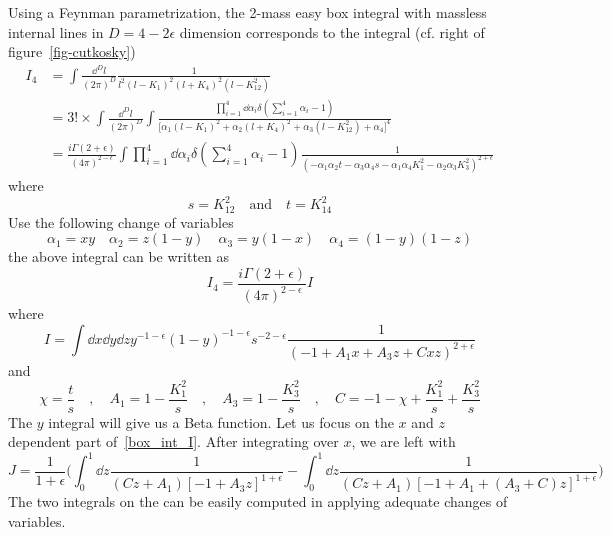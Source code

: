 Using a Feynman parametrization, the 2-mass easy box integral with massless internal lines in $D=4-2\epsilon$ dimension corresponds to the integral (cf. right of figure~\ref{fig-cutkosky})
\begin{equation}
\begin{split}
I_4 & = \int\frac{\dd^D l }{(2\pi)^D}\frac{1}{ l^2(l-K_1)^2(l+K_4)^2 (l-K_{12}^2)}
\\
&=
3!\times\int\frac{\dd^D l }{(2\pi)^D}
\int
\frac{\prod_{i=1}^4\dd\alpha_i \delta(\sum_{i=1}^4\alpha_i -1)}{\big[\alpha_1(l-K_1)^2 + \alpha_2(l+K_4)^2 + \alpha_3 (l-K_{12}^2) + \alpha_4\big]^4}
\\
&= \frac{i\Gamma(2+\epsilon)}{(4\pi)^{2-\epsilon}}\int\prod_{i=1}^4\dd\alpha_i \delta(\sum_{i=1}^4\alpha_i -1)\frac{1}{(-\alpha_1\alpha_2 t - \alpha_3\alpha_4 s 
-\alpha_1\alpha_4 K_1^2 - \alpha_2\alpha_3 K_{3}^2)^{2+\epsilon}}
\end{split}
\end{equation}
where
\begin{equation}
s=K_{12}^2 \quad\mathrm{and}\quad t=K_{14}^2
\end{equation}
Use the following change of variables
\begin{equation}
\alpha_1 = xy \quad
\alpha_2 = z(1-y)\quad
\alpha_3 = y(1-x)\quad
\alpha_4 = (1-y)(1-z)
\end{equation}
the above integral can be written as
\begin{equation}
I_4 = \frac{i\Gamma(2+\epsilon)}{(4\pi)^{2-\epsilon}} I
\end{equation}
where
\begin{equation}\label{box_int_I}
I = \int\dd x\dd y \dd z y^{-1-\epsilon}(1-y)^{-1-\epsilon}s^{-2-\epsilon}
\frac{1}{(-1 + A_1 x + A_3 z + C xz)^{2+\epsilon}}
\end{equation}
and
\begin{equation}
\chi = \frac{t}{s}\quad, \quad
A_1 = 1 - \frac{K_1^2}{s}\quad, \quad
A_3 = 1 - \frac{K_3^2}{s} \quad,\quad
C = -1 - \chi  + \frac{K_1^2}{s} + \frac{K_3^2}{s}
\end{equation}
The $y$ integral will give us a Beta function.
Let us focus on the $x$ and $z$ dependent part of~\cref{box_int_I}.
After integrating over $x$, we are left with 
\begin{equation}
J = \frac{1}{1+\epsilon}\Big(\int^1_0\dd z\frac{1}{(Cz + A_1)[-1 + A_3z]^{1+\epsilon}} - 
\int^1_0\dd z\frac{1}{(Cz + A_1)[-1 + A_1  + (A_3 + C)z]^{1+\epsilon} }\Big)
\end{equation}
The two integrals on the \rhs can be easily computed in applying adequate changes of variables.

